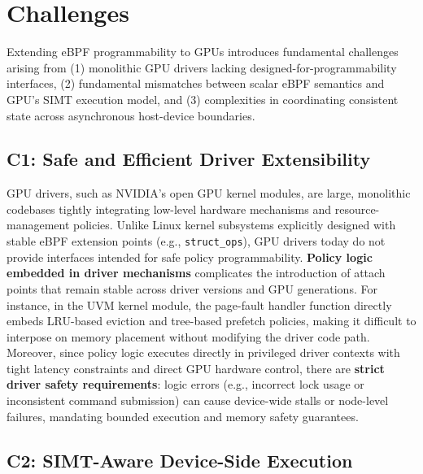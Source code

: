 \section{Challenges}
\label{sec:challenges}

Extending eBPF programmability to GPUs introduces fundamental challenges arising from (1) monolithic GPU drivers lacking designed-for-programmability interfaces, (2) fundamental mismatches between scalar eBPF semantics and GPU's SIMT execution model, and (3) complexities in coordinating consistent state across asynchronous host-device boundaries.

\subsection{C1: Safe and Efficient Driver Extensibility}

GPU drivers, such as NVIDIA's open GPU kernel modules, are large, monolithic codebases tightly integrating low-level hardware mechanisms and resource-management policies. Unlike Linux kernel subsystems explicitly designed with stable eBPF extension points (e.g., \texttt{struct\_ops}), GPU drivers today do not provide interfaces intended for safe policy programmability. \textbf{Policy logic embedded in driver mechanisms} complicates the introduction of attach points that remain stable across driver versions and GPU generations. For instance, in the UVM kernel module, the page-fault handler function directly embeds LRU-based eviction and tree-based prefetch policies, making it difficult to interpose on memory placement without modifying the driver code path. Moreover, since policy logic executes directly in privileged driver contexts with tight latency constraints and direct GPU hardware control, there are \textbf{strict driver safety requirements}: logic errors (e.g., incorrect lock usage or inconsistent command submission) can cause device-wide stalls or node-level failures, mandating bounded execution and memory safety guarantees.

\subsection{C2: SIMT-Aware Device-Side Execution}

